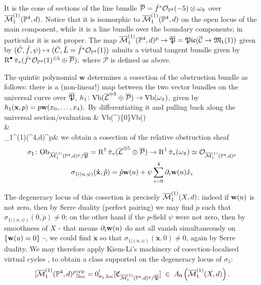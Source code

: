  \noindent It is the cone of sections of the line bundle $\overline{\mathcal P}=\bar{f}^*\mathcal{O}_{\mathbb P^4}(-5)\otimes\omega_{\bar{\pi}}$  over $\overline{\mathcal{M}}_1^{(1)}(\mathbb P^4,d)$. Notice that it is isomorphic to $\overline{\mathcal{M}}_1^{(1)}(\mathbb P^4,d)$ on the open locus of the main component, while it is a line bundle over the boundary components; in particular it is not proper. The map  $\overline{\mathcal{M}}_1^{(1)}(\mathbb P^4,d)^p\rightarrow\overline{\mathfrak P}=\mathfrak{Pic}(\overline{\mathcal C}\rightarrow\mathfrak M_1(1))$ given by $(\bar C,\bar f,\psi)\mapsto (\bar C,\bar L=\bar f^*\mathcal{O}_{\mathbb P^4}(1))$  admits a virtual tangent bundle given by $\operatorname{R}^{\bullet}\bar{\pi}_*(\bar f^*\mathcal{O}_{\mathbb P^4}(1)^{\oplus 5}\oplus \overline{\mathcal P}),$
 where $\overline{\mathcal P}$ is defined as above.

The quintic polynomial $\mathbf w$ determines a cosection of the obstruction bundle as follows: there is a (non-linear!) map between the two vector bundles on the universal curve over $\overline{\mathfrak{P}}$,
$ h_1\colon\rm{Vb}(\overline{\mathcal{L}}^{\oplus 5}\oplus\overline{\mathcal P})\rightarrow \rm{Vb}(\omega_{\bar\pi})$, given by $h_1(\mathbf{x},p)=p\mathbf{w}(x_0,\ldots,x_4).$
By differentiating it and pulling back along the universal section/evaluation
\bcd
& \rm{Vb}(\hL^{})\setminus\{0\}\oplus\rm{Vb}()\ar[d] \\
\hC\ar[ru,bend left,start anchor=north, end anchor=west,"\mathfrak e"]\ar[d,"\bar\pi"]\ar[r] & \hC\ar[d,"\bar\pi"] \\
 \oM_1^{(1)}(\PP^4,d)^p\ar[r] & \rm \hP
\ecd
 we obtain a cosection of the relative obstruction sheaf
\begin{multline}\label{eqn:cosection}
 \sigma_1\colon\rm{Ob}_{\overline{\mathcal{M}}_1^{(1)}(\mathbb P^4,d)^p/\overline{\mathfrak{P}}}=\operatorname{R}^1\bar\pi_*(\overline{\mathcal{L}}^{\oplus 5}\oplus\overline{\mathcal P})\rightarrow \operatorname{R}^1\bar\pi_*(\omega_{\bar\pi})\simeq \mathcal{O}_{\overline{\mathcal{M}}_1^{(1)}(\mathbb P^4,d)^p} \\
 \sigma_{1|(u,\psi)}(\mathring{\mathbf{x}},\mathring{p})=\mathring{p}\mathbf{w}(u)+\psi\sum_{i=0}^4\partial_i\mathbf{w}(u)\mathring{x}_i
\end{multline}

The degeneracy locus of this cosection is precisely $\overline{\mathcal{M}}_1^{(1)}(X,d)$: indeed if $\mathbf{w}(u)$ is not zero, then by Serre duality (perfect pairing) we may find $\mathring{p}$ such that $\sigma_{1|(u,\psi)}(0,\mathring{p})\neq 0$; on the other hand if the $p$-field $\psi$ were not zero, then by smoothness of $X$ - that means $\partial_i\mathbf{w}(u)$ do not all vanish simultaneously on $\{\mathbf{w}(u)=0\}$ -, we could find $\mathring{\mathbf{x}}$ so that $\sigma_{1|(u,\psi)}(\mathring{\mathbf{x}},0)\neq 0$, again by Serre duality. We may therefore apply Kiem-Li's machinery of cosection-localised virtual cycles \cite{KL}\cite[\S 5]{CL-pfields}, to obtain a class supported on the degeneracy locus of $\sigma_1$: \[[\overline{\mathcal{M}}_1^{(1)}(\mathbb P^4,d)^p]^{\mathrm{vir}}_{\mathrm{loc}}=0^{!}_{\sigma_1,\rm{loc}}[\mathfrak{C}_{\overline{\mathcal{M}}_1^{(1)}(\mathbb P^4,d)^p/\overline{\mathfrak{P}}}]\;\in\; A_0\left(\overline{\mathcal{M}}_1^{(1)}(X,d)\right).\] 

